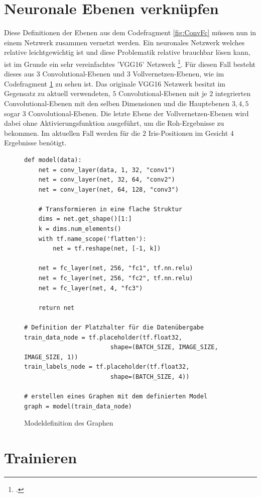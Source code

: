 \section{Neuronale Ebenen verknüpfen}

Diese Definitionen der Ebenen aus dem Codefragment \ref{fig:ConvFc} müssen nun in einem Netzwerk zusammen vernetzt werden. 
Ein neuronales Netzwerk welches relative leichtgewichtig ist und diese Problematik relative brauchbar lösen kann, ist im Grunde ein sehr vereinfachtes 'VGG16' Netzwerk \footcite{VGG16: TODO}.
Für diesen Fall besteht dieses aus $3$ Convolutional-Ebenen und $3$ Vollvernetzen-Ebenen, wie im Codefragment \ref{fig:buildGraph} zu sehen ist. 
Das originale VGG16 Netzwerk besitzt im Gegensatz zu aktuell verwendeten, $5$ Convolutional-Ebenen mit je $2$ integrierten Convolutional-Ebenen mit den selben Dimensionen und die Hauptebenen $3, 4, 5$ sogar $3$ Convolutional-Ebenen. 
Die letzte Ebene der Vollvernetzen-Ebenen wird dabei ohne Aktivierungsfunktion ausgeführt, um die Roh-Ergebnisse zu bekommen. 
Im aktuellen Fall werden für die $2$ Iris-Positionen im Gesicht $4$ Ergebnisse benötigt. 
\begin{figure}[ht!]
\lstset{language=Python}
\begin{lstlisting}
def model(data):
    net = conv_layer(data, 1, 32, "conv1")
    net = conv_layer(net, 32, 64, "conv2")
    net = conv_layer(net, 64, 128, "conv3")

    # Transformieren in eine flache Struktur
    dims = net.get_shape()[1:]
    k = dims.num_elements()
    with tf.name_scope('flatten'):
        net = tf.reshape(net, [-1, k])
    
    net = fc_layer(net, 256, "fc1", tf.nn.relu)    
    net = fc_layer(net, 256, "fc2", tf.nn.relu)
    net = fc_layer(net, 4, "fc3")
    
    return net
    
# Definition der Platzhalter für die Datenübergabe
train_data_node = tf.placeholder(tf.float32, 
						shape=(BATCH_SIZE, IMAGE_SIZE, IMAGE_SIZE, 1))
train_labels_node = tf.placeholder(tf.float32, 
						shape=(BATCH_SIZE, 4))

# erstellen eines Graphen mit dem definierten Model
graph = model(train_data_node)
\end{lstlisting}
	\caption{Modeldefinition des Graphen}
	\label{fig:buildGraph}
\end{figure}

\section{Trainieren}

